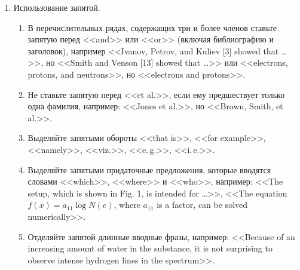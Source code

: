 \documentclass[a5paper, 10pt, twoside, numbers=enddot]{scrartcl}
\begin{document}
\begin{enumerate}
\begin{enumerate}
      \item Используйте дефис в модификаторах, которые содержат глаголы или глагольные формы,
        например: <<laser-induced reaction>>, <<problem-solving abilities>>, <<immobilized-phase
        method>>.

      \item Используйте дефис в модификаторах, которые состоят более, чем из двух слов, а также в
        модификаторах типа <<число-единица-измерения-слово>>, например: <<2-m-long pipe>>,
        <<3-year-old child>>, <<signal-to-noise ratio>>, <<out-of-plane distance>>.

      \item Используйте дефис в составных прилагательных, используемых в~качестве Predicate
        adjectives, например: <<This equation is first-order>>, <<This effect is
        temperature-dependent>>.
    \end{enumerate}

  \item Использование запятой.
    \begin{enumerate}
      \item В перечислительных рядах, содержащих три и более членов ставьте запятую перед <<and>>
        или <<or>> (включая библиографию и заголовок), например <<Ivanov, Petrov, and Kuliev [3]
        showed that \ldots>>, но <<Smith and Venson [13] showed that \ldots>> или <<electrons,
        protons, and neutrons>>, но <<electrons and protons>>.

      \item Не ставьте запятую перед <<et al.>>, если ему предшествует только одна фамилия,
        например: <<Jones et al.>>, но <<Brown, Smith, et al.>>.

      \item Выделяйте запятыми обороты <<that is>>, <<for example>>, <<namely>>, <<viz.>>,
        <<e.\,g.>>, <<i.\,e.>>.

      \item Выделяйте запятыми придаточные предложения, которые вводятся словами <<which>>,
        <<where>> и <<who>>, например: <<The setup, which is shown in Fig. 1, is intended for
        \ldots>>, <<The equation $f(x) = a_{11}\log N(e)$, where $a_{11}$ is a factor, can be solved
        numerically>>.

      \item Отделяйте запятой длинные вводные фразы, например: <<Because of an increasing amount of
        water in the substance, it is not surprising to observe intense hydrogen lines in the
        spectrum>>.
    \end{enumerate}


\end{enumerate}
\end{document}
